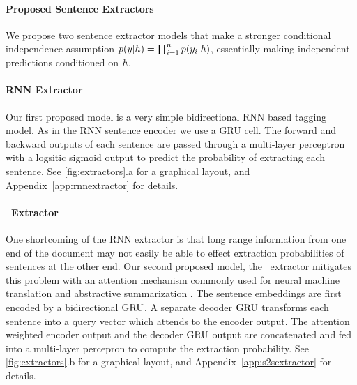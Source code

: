 \paragraph{Proposed Sentence Extractors}
We propose two sentence extractor models that 
make a stronger conditional independence 
assumption $p(\slabel|\sentEmb)=\prod_{i=1}^\docSize p(\slabel[i]|\sentEmb)$,
essentially making independent predictions conditioned on $\sentEmb$.

\paragraph{RNN Extractor}
    Our first proposed model is a very simple bidirectional
RNN based tagging model. As in the RNN sentence encoder we use a GRU cell.
The forward and backward outputs of each sentence are passed through a 
multi-layer perceptron with a logsitic sigmoid output 
to predict the probability
of extracting each sentence. 
See \autoref{fig:extractors}.a for a graphical layout,
and Appendix~\ref{app:rnnextractor} for details.


\paragraph{\sts~Extractor} One shortcoming of the RNN extractor is that long range
information from one end of the document may not easily be able to effect 
extraction probabilities of sentences at the other end. 
Our second proposed model, the \sts~extractor mitigates this problem with an 
attention 
mechanism commonly
used for neural machine translation \cite{bahdanau2014neural} and 
abstractive summarization \cite{see2017get}. 
The sentence embeddings are first
encoded by a bidirectional $\operatorname{GRU}$. A separate decoder $\operatorname{GRU}$ transforms each 
sentence into a query vector which attends to the encoder output. The
attention weighted encoder output and the decoder $\operatorname{GRU}$ output are concatenated
and fed into a multi-layer percepron to compute the extraction probability.
See \autoref{fig:extractors}.b for a graphical layout,
and Appendix~\ref{app:s2sextractor} for details.

